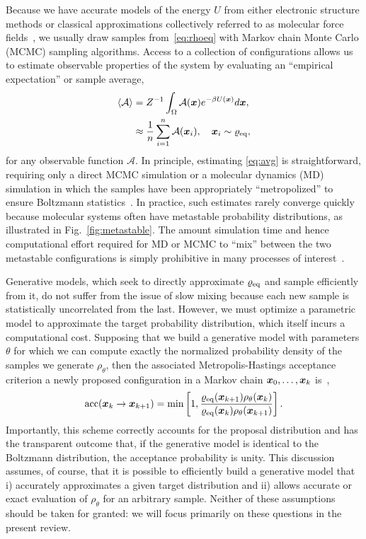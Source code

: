 \documentclass[11pt]{article}
\begin{document}
Because we have accurate models of the energy $U$ from either electronic structure methods or classical approximations collectively referred to as molecular force fields~\cite{case_amber_2005, vanommeslaeghe_charmm_2010}, we usually draw samples from~\eqref{eq:rhoeq} with Markov chain Monte Carlo (MCMC) sampling algorithms.
Access to a collection of configurations allows us to estimate observable properties of the system by evaluating an ``empirical expectation'' or sample average,
\begin{equation}
\begin{aligned}
    \left\langle \mathcal{A} \right\rangle &= Z^{-1} \int_{\Omega} \mathcal{A}(\boldsymbol{x}) e^{-\beta U(\boldsymbol{x})} d\boldsymbol{x}, \\
    &\approx \frac1n \sum_{i=1}^n \mathcal{A}(\boldsymbol{x}_i), \quad \boldsymbol{x}_i \sim \varrho_{\rm eq},
    \label{eq:avg}
\end{aligned}
\end{equation}
for any observable function $\mathcal{A}.$
In principle, estimating \eqref{eq:avg} is straightforward, requiring only a direct MCMC simulation or a molecular dynamics (MD) simulation in which the samples have been appropriately ``metropolized'' to ensure Boltzmann statistics~\cite{frenkel_understanding_2002}. 
In practice, such estimates rarely converge quickly because molecular systems often have metastable probability distributions, as illustrated in Fig.~\ref{fig:metastable}. 
The amount simulation time and hence computational effort required for MD or MCMC to ``mix'' between the two metastable configurations is simply prohibitive in many processes of interest~\cite{lelievre_free_2010}.

Generative models, which seek to directly approximate $\varrho_{\rm eq}$ and sample efficiently from it, do not suffer from the issue of slow mixing because each new sample is statistically uncorrelated from the last.
However, we must optimize a parametric model to approximate the target probability distribution, which itself incurs a computational cost.
Supposing that we build a generative model with parameters $\theta$ for which we can compute exactly the normalized probability density of the samples we generate $\rho_{\theta}$, then the associated Metropolis-Hastings acceptance criterion a newly proposed configuration in a Markov chain $\boldsymbol{x}_0, \dots, \boldsymbol{x}_k$ is~\cite{gabrie_adaptive_2022},
\begin{equation}
    \textrm{acc}(\boldsymbol{x}_k \to \boldsymbol{x}_{k+1}) = \min \left[ 1, \frac{\varrho_{\rm eq}(\boldsymbol{x}_{k+1})\rho_{\theta}(\boldsymbol{x}_{k}) }{\varrho_{\rm eq}(\boldsymbol{x}_{k})\rho_{\theta}(\boldsymbol{x}_{k+1}) }\right].
\end{equation}
Importantly, this scheme correctly accounts for the proposal distribution and has the transparent outcome that, if the generative model is identical to the Boltzmann distribution, the acceptance probability is unity. 
This discussion assumes, of course, that it is possible to efficiently build a generative model that i) accurately approximates a given target distribution and ii) allows accurate or exact evaluation of $\rho_{\theta}$ for an arbitrary sample. 
Neither of these assumptions should be taken for granted: we will focus primarily on these questions in the present review.
\end{document}
